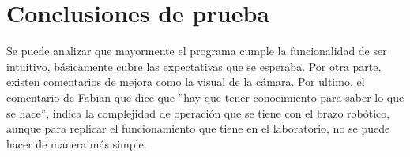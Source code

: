 \section{Conclusiones de prueba}
Se puede analizar que mayormente el programa cumple la funcionalidad de ser intuitivo, básicamente cubre las expectativas que se esperaba.
Por otra parte, existen comentarios de mejora como la visual de la cámara.
Por ultimo, el comentario de Fabian que dice que ''hay que tener conocimiento para saber lo que se hace'', indica la complejidad de operación que se tiene con el brazo robótico, aunque para replicar el funcionamiento que tiene en el laboratorio, no se puede hacer de manera más simple.